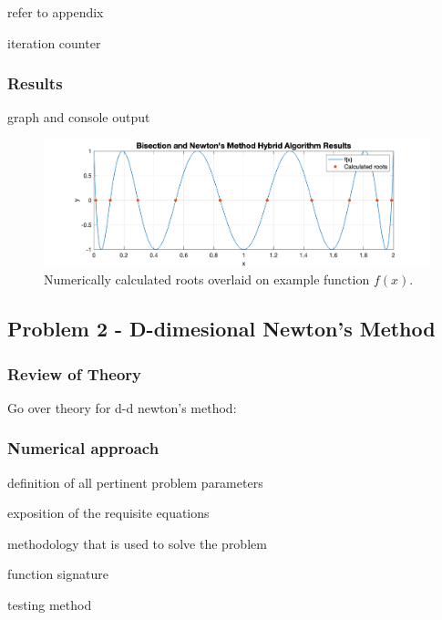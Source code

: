\documentclass[10pt]{article}
\begin{document}
refer to appendix 

iteration counter

\subsubsection*{Results}

graph and console output 

\begin{figure}[h!]
\centering
\includegraphics[width=1\textwidth]{HybridPlot.png}
\caption{Numerically calculated roots overlaid on example function $f(x)$.}
\end{figure}

\pagebreak

\subsection*{Problem 2 - D-dimesional Newton's Method}

\subsubsection*{Review of Theory}
Go over theory for d-d newton's method: 

\subsubsection*{Numerical approach}

definition of all pertinent problem parameters

exposition of the requisite equations

methodology that is used to solve the problem

function signature 

testing method 
\end{document}
